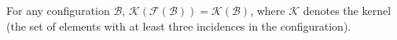 For any configuration $\mathcal{B}$, $\mathcal{K}(\mathcal{F}(\mathcal{B})) = \mathcal{K}(\mathcal{B})$, where $\mathcal{K}$ denotes the kernel (the set of elements with at least three incidences in the configuration).

